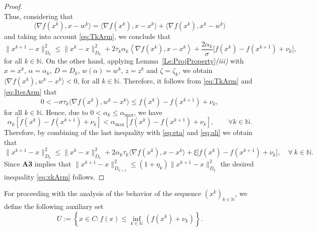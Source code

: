 \begin{proof}
$$	$$
	Thus, considering that
	$$
		\big\langle \nabla f(x^k), x-w^k\big\rangle = \big\langle \nabla f(x^k), x-x^k\big\rangle + \big\langle \nabla f(x^k), x^k-w^k \big\rangle
	$$
	and taking into account \eqref{eq:TkArm}, we conclude that
	\begin{equation} \label{eq;ali}
		\|x^{k+1}-x\|_{D_k}^2 \leq  \|x^k-x\|_{D_k}^2 + 2\tau_k\alpha_k \left\langle \nabla f(x^k),x-x^k\right\rangle + \frac{2 \alpha_k}{\sigma} \big[f(x^k)-f(x^{k+1})+\nu_k\big],
	\end{equation}
	for all $ k \in \mathbb{N}$.  On the other hand, applying Lemma~\ref{Le:ProjProperty}{\it (iii)}  with $x=x^k$, $\alpha=\alpha_k$, $D = D_k$, $w(\alpha) = w^k$, $z = z^k$ and $\zeta= \zeta_k$, we obtain  $\langle \nabla f(x^k), w^k- x^k \rangle <  0$, for all  $ k \in \mathbb{N}$. Therefore, it follows from \eqref{eq:TkArm} and \eqref{eq:IterArm} that
	$$0 < -\sigma\tau_{k} \big\langle \nabla f(x^{k}), w^{k}-x^{k} \big\rangle \leq f(x^{k}) - f(x^{k+1})+\nu_k,$$
	for all $k \in \mathbb{N}$. Hence, due to $0< \alpha_k\leq  \alpha_{\max}$,  we have
	$$
		\alpha_k[f(x^k)-f(x^{k+1})+\nu_k] < \alpha_{\max} [f(x^k)-f(x^{k+1})+\nu_k], \qquad \forall k \in \mathbb{N}.
	$$
	{Therefore, by combining  of the  last inequality with \eqref{eq:eta} and  \eqref{eq;ali} we obtain that
	$$
		\|x^{k+1}-x\|_{D_k}^2 \leq \|x^k-x\|_{D_k}^2 + 2\alpha_k\tau_k \big\langle \nabla f(x^k), x-x^k\big\rangle + \xi \big[f(x^k) - f(x^{k+1})+ \nu_k \big], \quad \forall ~k \in \mathbb{N}.
	$$
	Since {\bf A3}  implies that $\|x^{k+1}-x\|_{D_{k+1}}^2\leq (1+\eta_k) \|x^{k+1}-x\|_{D_k}^2$ the desired inequality \eqref{eq:xkArm} follows.}
\end{proof}

For proceeding with the analysis of  the behavior of the sequence $(x^k)_{k\in\mathbb{N}}$,  we define the following auxiliary set
\begin{equation*}\label{eq:SetTArm}
	U := \left\{x \in C: f(x) \leq \inf_{k\in {\mathbb N}}\left(f(x^{k})+\nu_k\right) \right\}.
\end{equation*}

